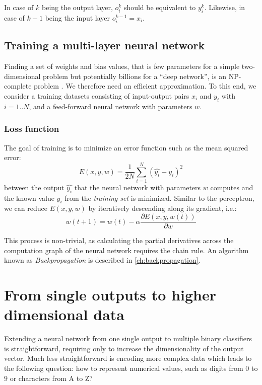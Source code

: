 In case of $k$ being the output layer, $o_i^k$ should be equivalent to $y_i^k$. Likewise, in case of $k-1$ being the input layer $o_i^{k-1}=x_i$.

\subsection{Training a multi-layer neural network}

Finding a set of weights and bias values, that is few parameters for a simple two-dimensional problem but potentially billions for a ``deep network'', is an NP-complete problem \cite{blum1992training}.
We therefore need an efficient approximation. To this end, we consider a training datasets consisting of input-output pairs $x_i$ and $y_i$ with $i=1..N$, and a feed-forward neural network with parameters $w$.

\subsubsection{Loss function}\label{sec:lossfunction}

The goal of training is to minimize an error function such as the mean squared error:
\begin{equation}
E(x,y,w)=\frac{1}{2N}\sum_{i=1}^{N}(\hat{y_i}-y_i)^2
\end{equation}
between the output $\hat{y_i}$ that the neural network with parameters $w$ computes and the known value $y_i$ from the \textsl{training set} is minimized.
%
Similar to the perceptron, we can reduce $E(x,y,w)$ by iteratively descending along its gradient, i.e.:
\begin{equation}
w(t+1)=w(t)-\alpha \frac{\partial E(x,y,w(t))}{\partial w}
\end{equation}

This process is non-trivial, as calculating the partial derivatives across the computation graph of the neural network requires the chain rule. An algorithm known as \textsl{Backpropagation} is described in \cref{ch:backpropagation}.


\section{From single outputs to higher dimensional data}

Extending a neural network from one single output to multiple binary classifiers is straightforward, requiring only to increase the dimensionality of the output vector.
Much less straightforward is encoding more complex data which leads to the following question: how to represent numerical values, such as digits from $0$ to $9$ or characters from A to Z?

